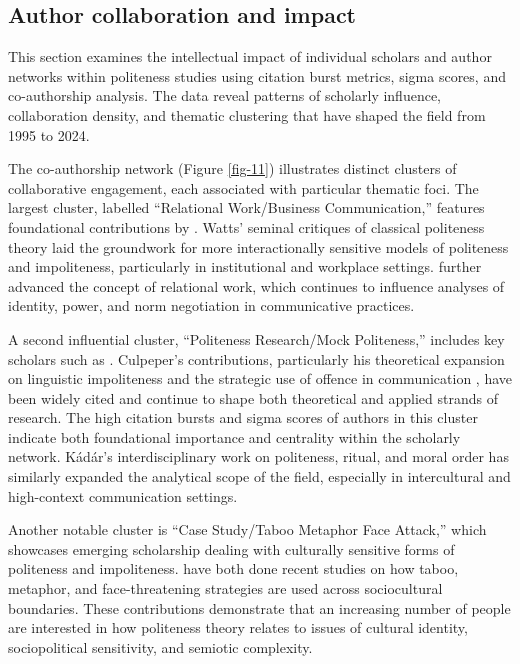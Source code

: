 \documentclass[english]{textolivre}
\begin{document}
\subsection{Author collaboration and impact}
This section examines the intellectual impact of individual scholars and author networks within politeness studies using citation burst metrics, sigma scores, and co-authorship analysis. The data reveal patterns of scholarly influence, collaboration density, and thematic clustering that have shaped the field from 1995 to 2024.

The co-authorship network (Figure \ref{fig-11}) illustrates distinct clusters of collaborative engagement, each associated with particular thematic foci. The largest cluster, labelled ``Relational Work/Business Communication,'' features foundational contributions by \textcite{watts2003, locher2005b}. Watts’ seminal critiques of classical politeness theory laid the groundwork for more interactionally sensitive models of politeness and impoliteness, particularly in institutional and workplace settings. \textcite{locher2005b} further advanced the concept of relational work, which continues to influence analyses of identity, power, and norm negotiation in communicative practices.

A second influential cluster, ``Politeness Research/Mock Politeness,'' includes key scholars such as \textcite{kadar2017a, kadar2013, culpeper2011b, culpeper2017}. Culpeper’s contributions, particularly his theoretical expansion on linguistic impoliteness and the strategic use of offence in communication \cite{culpeper2011a}, have been widely cited and continue to shape both theoretical and applied strands of research. The high citation bursts and sigma scores of authors in this cluster indicate both foundational importance and centrality within the scholarly network. Kádár’s interdisciplinary work on politeness, ritual, and moral order has similarly expanded the analytical scope of the field, especially in intercultural and high-context communication settings.

Another notable cluster is ``Case Study/Taboo Metaphor Face Attack,'' which showcases emerging scholarship dealing with culturally sensitive forms of politeness and impoliteness. \textcite{xie2024, abdelraheem2024} have both done recent studies on how taboo, metaphor, and face-threatening strategies are used across sociocultural boundaries. These contributions demonstrate that an increasing number of people are interested in how politeness theory relates to issues of cultural identity, sociopolitical sensitivity, and semiotic complexity.
\end{document}
